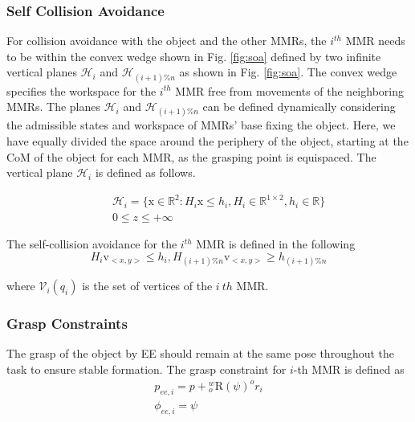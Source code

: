 \subsubsection{Self Collision Avoidance} \label{sca}
For collision avoidance with the object and the other MMRs, the $i^{th}$ MMR needs to be within the convex wedge shown in Fig. \ref{fig:soa} defined by two infinite vertical planes $\mathcal{H}_i$ and $\mathcal{H}_{(i+1)\%n}$ as shown in Fig. \ref{fig:soa}. The convex wedge specifies the workspace for the $i^{th}$ MMR free from movements of the neighboring MMRs. The planes $\mathcal{H}_i$ and $\mathcal{H}_{(i+1)\%n}$ can be defined dynamically considering the admissible states and workspace of MMRs’ base fixing the object. Here, we have equally divided the space around the periphery of the object, starting at the CoM of the object for each MMR, as the grasping point is equispaced. The vertical plane $\mathcal{H}_i$ is defined as follows.

\begin{equation}\label{eqn:13}
	\begin{aligned}
	\quad & \mathcal{H}_i =\{\textrm{x}\in\mathbb{R}^2:H_i\textrm{x}\leq h_i, H_i\in\mathbb{R}^{1\times 2}, h_i\in\mathbb{R}\}\\
	\quad & 0\leq z \leq + \infty
	\end{aligned}	
\end{equation}

The self-collision avoidance for the $i^{th}$  MMR is defined in the following
\begin{equation}\label{eqn:sca}
		H_i\mathrm{v}_{<x,y>}\leq h_i, H_{(i+1)\%n}\mathrm{v}_{<x,y>}\geq h_{(i+1)\%n}
\end{equation}

where $\mathscr{V}_i(q_i)$ is the set of vertices of the $i\ th$  MMR.
\subsubsection{Grasp Constraints} \label{gc}
The grasp of the object by EE should remain at the same pose throughout the task to ensure stable formation. The grasp constraint for $i$-th MMR is defined as
\begin{subequations}\label{gpoc}
        \begin{align}
            p_{ee,i}=p +{}^w_o\textrm{R}(\psi)^or_i\label{gpc}\\
            \phi_{ee,i} = \psi
            \label{gpo}
        \end{align}
        \label{gpco}
\end{subequations}

